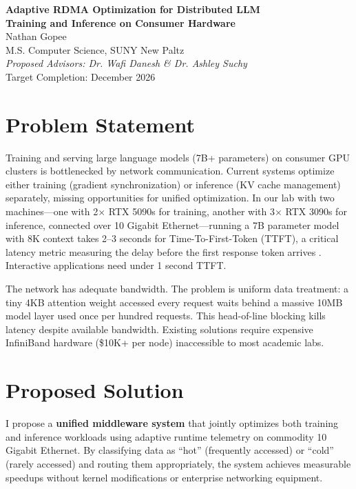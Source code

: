 \documentclass[10pt,letterpaper]{article}
\begin{document}
\begin{center}
{\LARGE \textbf{Adaptive RDMA Optimization for Distributed LLM\\Training and Inference on Consumer Hardware}}\\[8pt]
{\large Nathan Gopee}\\
M.S. Computer Science, SUNY New Paltz\\
\textit{Proposed Advisors: Dr. Wafi Danesh \& Dr. Ashley Suchy}\\
Target Completion: December 2026
\end{center}

\section{Problem Statement}

Training and serving large language models (7B+ parameters) on consumer GPU clusters is bottlenecked by network communication. Current systems optimize either training (gradient synchronization) or inference (KV cache management) separately, missing opportunities for unified optimization. In our lab with two machines---one with 2$\times$ RTX 5090s for training, another with 3$\times$ RTX 3090s for inference, connected over 10 Gigabit Ethernet---running a 7B parameter model with 8K context takes 2--3 seconds for Time-To-First-Token (TTFT), a critical latency metric measuring the delay before the first response token arrives \cite{nvidia-nim}. Interactive applications need under 1 second TTFT.

The network has adequate bandwidth. The problem is uniform data treatment: a tiny 4KB attention weight accessed every request waits behind a massive 10MB model layer used once per hundred requests. This head-of-line blocking kills latency despite available bandwidth. Existing solutions require expensive InfiniBand hardware (\$10K+ per node) inaccessible to most academic labs.

\section{Proposed Solution}

I propose a \textbf{unified middleware system} that jointly optimizes both training and inference workloads using adaptive runtime telemetry on commodity 10 Gigabit Ethernet. By classifying data as ``hot'' (frequently accessed) or ``cold'' (rarely accessed) and routing them appropriately, the system achieves measurable speedups without kernel modifications or enterprise networking equipment.
\end{document}
